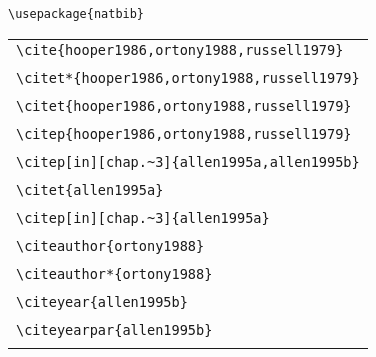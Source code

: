 \documentclass{article}
\begin{document}
\verb#\usepackage{natbib}#\\

\begin{center}
\begin{tabular}{l}
\verb#\cite{hooper1986,ortony1988,russell1979}# \\
\cite{hooper1986,ortony1988,russell1979}  \\\hline 
\verb#\citet*{hooper1986,ortony1988,russell1979}# \\
 \citet*{hooper1986,ortony1988,russell1979}  \\\hline
\verb#\citet{hooper1986,ortony1988,russell1979}# \\
 \citet{hooper1986,ortony1988,russell1979}  \\\hline
\verb#\citep{hooper1986,ortony1988,russell1979}# \\
 \citep{hooper1986,ortony1988,russell1979}  \\\hline
[Fails in 1.9.15] \verb#\citep[in][chap.~3]{allen1995a,allen1995b}# \\
 \citep[in][chap.~3]{allen1995a,allen1995b} \\\hline
\verb#\citet{allen1995a}# \\
 \citet{allen1995a} \\\hline
\verb#\citep[in][chap.~3]{allen1995a}# \\
 \citep[in][chap.~3]{allen1995a} \\\hline
\verb#\citeauthor{ortony1988}# \\
 \citeauthor{ortony1988} \\\hline
\verb#\citeauthor*{ortony1988}# \\
 \citeauthor*{ortony1988} \\\hline
\verb#\citeyear{allen1995b}# \\
 \citeyear{allen1995b} \\\hline
\verb#\citeyearpar{allen1995b}# \\
 \citeyearpar{allen1995b} \\\hline
\end{tabular}
\end{center}
\end{document}
